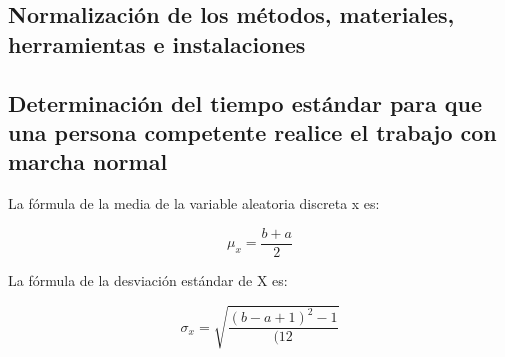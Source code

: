     \subsection{Normalización de los métodos, materiales, herramientas e instalaciones}
    \subsection{Determinación del tiempo estándar para que una persona competente realice el trabajo con marcha normal}
    La fórmula de la media de la variable aleatoria discreta x es:
    
    \begin{equation}
        \mu_x=\dfrac{b+a}{2}
    \end{equation}
    
    La fórmula de la desviación estándar de X es:
    
    \begin{equation}
    \sigma_x=\sqrt{\dfrac{(b-a+1)^2-1}{(12}}
    \end{equation}
    
    
    
    
    
    
